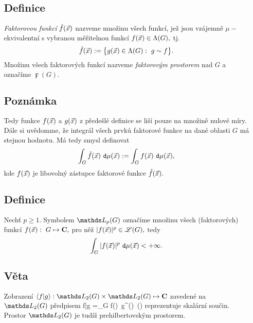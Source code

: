 \subsection{Definice}
\emph{Faktorovou funkc\'i} $\hat{f}({\vec{x}})$ nazveme mno\v zinu v\v sech
funkc\'i, je\v z jsou vz\'ajemn\v e $\mu-$ekvivalentn\'i s vybranou m\v e\v
ritelnou funkc\'i $f({\vec{x}})\in \Lambda(G),$ tj.
%
$$\hat{f}({\vec{x}}):=\bigl\{g({\vec{x}})\in\Lambda(G):~ g \sim f \bigr\}.$$
%
Mno\v zinu v\v sech faktorov\'ych funkc\'i nazveme
\emph{faktorov\'ym prostorem} nad $G$ a ozna\v c\'ime $\digamma(G).$


\subsection{Pozn\'amka}

Tedy funkce $f({\vec{x}})$ a $g({\vec{x}})$ z p\v rede\v sl\'e definice se li\v
s\'i pouze na mno\v zin\v e nulov\'e m\'iry. D\'ale si uv\v edomme,
\v ze integr\'al v\v sech prvk\r u faktorov\'e funkce na dan\'e
oblasti $G$ m\'a stejnou hodnotu. M\'a tedy smysl definovat
%
$$\int_G \hat{f}({\vec{x}})~\mathtt{d}\mu({\vec{x}}):=\int_G f({\vec{x}})~\mathtt{d}\mu({\vec{x}}),$$
%
kde $f({\vec{x}})$ je libovoln\'y z\'astupce faktorov\'e funkce
$\hat{f}({\vec{x}}).$


\subsection{Definice}

Nech\v t $p\geq 1.$ Symbolem $\LL_p(G)$ ozna\v c\'ime mno\v zinu v\v
sech (faktorov\'ych) funkc\'i $f({\vec{x}}):~G\mapsto {\mathbf C},$ pro n\v e\v z
$|f({\vec{x}})|^p\in{\mathscr L}(G),$ tedy
%
$$\int_G |f({\vec{x}})|^p~\mathtt{d}\mu({\vec{x}})<+\infty.$$


\subsection{Věta}

Zobrazen\'i $\la f|g \ra: \LL_2(G) \times \LL_2(G) \mapsto\C$ zaveden\'e na $\LL_2(G)$ p\v redpisem
%
\BE \bla f|g \bra=\int_{G} f(\x)~g^\star(\x)~\dmu(\x) \label{skalarnisoucin} \EE
%
reprezentuje skal\'arn\'i sou\v cin. Prostor $\LL_2(G)$ je tud\'i\v z prehilbertovsk\'ym prostorem.\\

\Proof

